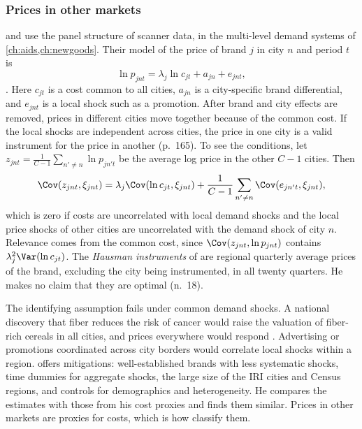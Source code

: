 \subsubsection{Prices in other markets}
\citet{HausmanLeonardZona1994} and \citet{Hausman1997} use the panel structure of scanner data, in the
multi-level demand systems of \cref{ch:aids,ch:newgoods}. Their model of the price of brand $j$ in city $n$ and
period $t$ is
\begin{equation*}
  \ln p_{jnt} = \lambda_j\ln c_{jt} + a_{jn} + e_{jnt},
\end{equation*}
\citep[p.~164, eq.~4]{HausmanLeonardZona1994}. Here $c_{jt}$ is a cost common to all cities, $a_{jn}$ is a
city-specific brand differential, and $e_{jnt}$ is a local shock such as a promotion. After brand and city effects
are removed, prices in different cities move together because of the common cost. If the local shocks are
independent across cities, the price in one city is a valid instrument for the price in another (p.~165).
To see the conditions, let $z_{jnt} = \frac{1}{C - 1}\sum_{n' \neq n}\ln p_{jn't}$ be the average log price in
the other $C - 1$ cities. Then
\begin{equation*}
  \Cov(z_{jnt}, \xi_{jnt}) = \lambda_j\Cov(\ln c_{jt}, \xi_{jnt}) + \frac{1}{C - 1}\sum_{n' \neq
  n}\Cov(e_{jn't}, \xi_{jnt}),
\end{equation*}
which is zero if costs are uncorrelated with local demand shocks and the local price shocks of other cities are
uncorrelated with the demand shock of city $n$. Relevance comes from the common cost, since
$\Cov(z_{jnt}, \ln p_{jnt})$ contains $\lambda_j^2\Var(\ln c_{jt})$. The \emph{Hausman instruments} of
\citet[pp.~320--321]{Nevo2001} are regional quarterly average prices of the brand, excluding the city being
instrumented, in all twenty quarters. He makes no claim that they are optimal (n.~18).

The identifying assumption fails under common demand shocks. A national discovery that fiber reduces the risk
of cancer would raise the valuation of fiber-rich cereals in all cities, and prices everywhere would respond
\citep[p.~321]{Nevo2001}. Advertising or promotions coordinated across city borders would correlate local shocks
within a region. \citet[p.~321]{Nevo2001} offers mitigations: well-established brands with less systematic
shocks, time dummies for aggregate shocks, the large size of the IRI cities and Census regions, and controls
for demographics and heterogeneity. He compares the estimates with those from his cost proxies and finds them
similar. Prices in other markets are proxies for costs, which is how \citet[p.~1761]{BerryHaile2014} classify
them.

